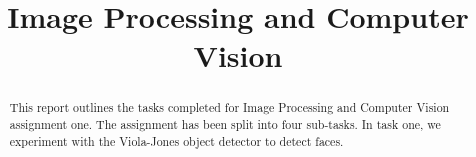 \documentclass[conference]{IEEEtran}
\begin{document}
\title{Image Processing and Computer Vision\\
}
\author{
\and
{}
}


\maketitle

\begin{abstract}
This report outlines the tasks completed for Image Processing and Computer Vision assignment one. The assignment has been split into four sub-tasks. In task one, we experiment with the Viola-Jones object detector to detect faces.
\end{abstract}
\end{document}
